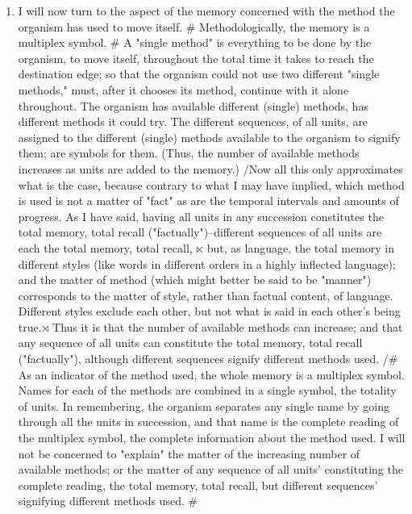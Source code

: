 \documentclass[10pt,twoside,draft]{memoir}
\begin{document}
{{\begin{enumerate}
\item I will now turn to the aspect of the memory concerned with the 
method the organism has used to move itself. \# Methodologically, the 
memory is a multiplex symbol. \# A "single method" is everything to be done 
by the organism, to move itself, throughout the total time it takes to reach 
the destination edge; so that the organism could not use two different 
"single methods," must, after it chooses its method, continue with it alone 
throughout. The organism has available different (single) methods, has 
different methods it could try. The different sequences, of all units, are 
assigned to the different (single) methods available to the organism to signify 
them; are symbols for them. (Thus, the number of available methods 
increases as units are added to the memory.) \slash Now all this only approximates 
what is the case, because contrary to what I may have implied, which 
method is used is not a matter of "fact" as are the temporal intervals and 
amounts of progress. As I have said, having all units in any succession 
constitutes the total memory, total recall ("factually")--different sequences 
of all units are each the total memory, total recall, $\ltimes$ but, as language, the 
total memory in different styles (like words in different orders in a highly 
inflected language); and the matter of method (which might better be said to 
be "manner") corresponds to the matter of style, rather than factual 
content, of language. Different styles exclude each other, but not what is 
said in each other's being true.$\rtimes$ Thus it is that the number of available 
methods can increase; and that any sequence of all units can constitute the 
total memory, total recall ("factually"), although different sequences signify 
different methods used. \slash \# As an indicator of the method used, the whole 
memory is a multiplex symbol. Names for each of the methods are combined 
in a single symbol, the totality of units. In remembering, the organism 
separates any single name by going through all the units in succession, and 
that name is the complete reading of the multiplex symbol, the complete 
information about the method used. I will not be concerned to "explain" 
the matter of the increasing number of available methods; or the matter of 
any sequence of all units' constituting the complete reading, the total 
memory, total recall, but different sequences' signifying different methods 
used. \#


\end{enumerate}}}
\end{document}
